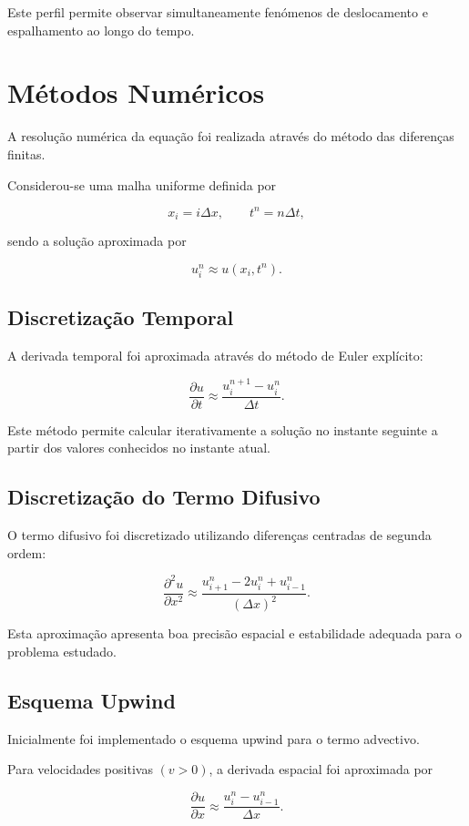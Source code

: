 \documentclass{article}
\begin{document}
Este perfil permite observar simultaneamente fenómenos de deslocamento e espalhamento ao longo do tempo.

\section{Métodos Numéricos}

A resolução numérica da equação foi realizada através do método das diferenças finitas.

Considerou-se uma malha uniforme definida por

\[
x_i = i\Delta x,
\qquad
t^n = n\Delta t,
\]

sendo a solução aproximada por

\[
u_i^n \approx u(x_i,t^n).
\]

\subsection{Discretização Temporal}

A derivada temporal foi aproximada através do método de Euler explícito:

\[
\frac{\partial u}{\partial t}
\approx
\frac{u_i^{n+1}-u_i^n}{\Delta t}.
\]

Este método permite calcular iterativamente a solução no instante seguinte a partir dos valores conhecidos no instante atual.

\subsection{Discretização do Termo Difusivo}

O termo difusivo foi discretizado utilizando diferenças centradas de segunda ordem:

\[
\frac{\partial^2 u}{\partial x^2}
\approx
\frac{
u_{i+1}^n
-
2u_i^n
+
u_{i-1}^n
}{
(\Delta x)^2
}.
\]

Esta aproximação apresenta boa precisão espacial e estabilidade adequada para o problema estudado.

\subsection{Esquema Upwind}

Inicialmente foi implementado o esquema upwind para o termo advectivo.

Para velocidades positivas $(v>0)$, a derivada espacial foi aproximada por

\[
\frac{\partial u}{\partial x}
\approx
\frac{
u_i^n-u_{i-1}^n
}{
\Delta x
}.
\]
\end{document}
